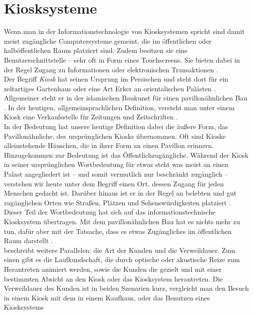\section{Kiosksysteme}
\label{sec:kiosk}

Wenn man in der Informationstechnologie von Kiosksystemen spricht
sind damit meist zugängliche Computersysteme gemeint, die im öffentlichen oder halböffentlichen 
Raum platziert sind. Zudem besitzen sie eine Benutzerschnittstelle -- sehr oft in Form
eines Touchscreens. Sie bieten dabei in der Regel Zugang zu Informationen 
oder elektronischen Transaktionen \cite{retailing}.\\

Der Begriff \emph{Kiosk} hat seinen Ursprung im Persischen und steht dort für
ein zeltartiges Gartenhaus oder eine Art Erker an orientalischen Palästen \cite{meyers}.
Allgemeiner steht er in der islamischen Baukunst für einen pavillonähnlichen Bau \cite{taschenlexikon}.
In der heutigen, allgemeinsprachlichen Definition, versteht man unter einem Kiosk eine Verkaufsstelle
für Zeitungen und Zeitschriften \cite{taschenlexikon, meyers}.\\
In der Bedeutung hat unsere heutige Definition dabei die äußere Form, das Pavillonähnliche, 
des ursprünglichen Kiosks übernommen. Oft sind Kioske alleinstehende Häuschen, die in ihrer Form
an einen Pavillon erinnern. Hinzugekommen zur Bedeutung ist das Öffentlichzugängliche. Während der Kiosk 
in seiner ursprünglichen Wortbedeutung für etwas steht was meist an einen Palast angegliedert ist -- und 
somit vermutlich nur beschränkt zugänglich -- verstehen wir heute unter dem Begriff einen Ort, dessen Zugang
für jeden Menschen gedacht ist. Darüber hinaus ist er in der Regel an belebten und gut zugänglichen Orten 
wie Straßen, Plätzen und Sehenswürdigkeiten platziert \cite{multimediale}.\\
Dieser Teil der Wortbedeutung hat sich auf das informationstechnische Kiosksystem übertragen. Mit dem 
pavillonähnlichen Bau hat es nichts mehr zu tun, dafür aber mit der Tatsache, dass es etwas Zugängliches 
im öffentlichen Raum darstellt \cite{multimediale}.\\
 beschreibt weitere Parallelen: die Art der Kunden und 
die Verweildauer. Zum einen gibt es die Laufkundschaft, die durch optische oder akustische Reize
zum Herantreten animiert werden, sowie die Kunden die gezielt und mit einer bestimmten Absicht an den Kiosk
oder das Kiosksystem herantreten. Die Verweildauer des Kunden ist in beiden Szenarien kurz, 
vergleicht man den Besuch in einem Kiosk mit dem in einem Kaufhaus, oder das Benutzen eines Kiosksystems
